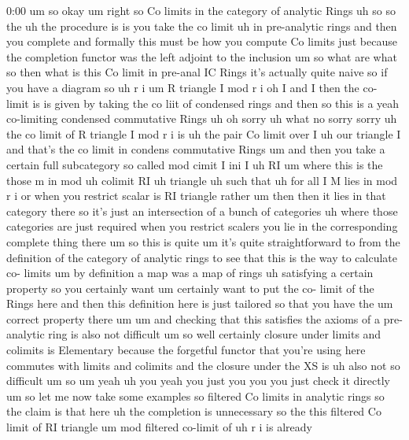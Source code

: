\begin{unfinished}{0:00}
um  so  okay  um  right  so  Co  limits  in  the
category  of  analytic
Rings  uh  so  so  the  uh  the  procedure  is
is  you  take  the  co
limit  uh  in  pre-analytic
rings  and  then  you
complete  and  formally  this  must  be  how
you  compute  Co  limits  just  because  the
completion  functor  was  the  left  adjoint
to  the
inclusion  um  so  what  are  what  so  then
what  is  this  Co  limit  in  pre-anal  IC
Rings  it's  actually  quite  naive  so  if
you  have  a  diagram
so  uh  r  i  um  R  triangle  I
mod  r  i  oh  I  and  I  then  the  co-  limit
is  is  given  by  taking  the  co  liit  of
condensed
rings
and  then  so  this  is  a
yeah  co-limiting  condensed  commutative
Rings  uh  oh  sorry  uh  what  no  sorry  sorry
uh  the  co  limit  of  R  triangle  I  mod  r
i  is  uh  the  pair  Co  limit  over  I  uh  our
triangle  I  and  that's  the  co  limit  in
condens  commutative  Rings  um  and  then
you  take  a  certain  full  subcategory  so
called  mod  cimit  I  ini  I
uh  RI  um  where  this  is  the  those  m  in
mod  uh  colimit
RI  uh  triangle  uh  such  that  uh  for  all  I
M  lies  in  mod  r  i  or  when  you  restrict
scalar  is  RI  triangle  rather  um  then
then  it  lies  in  that  category
there  so  it's  just  an  intersection  of  a
bunch  of  categories  uh  where  those
categories  are  just  required  when  you
restrict  scalers  you  lie  in  the
corresponding  complete  thing
there
um  so  this  is  quite
um
it's  quite  straightforward  to  from  the
definition  of  the  category  of  analytic
rings  to  see  that  this  is  the  way  to
calculate  co-  limits  um  by  definition  a
map  was  a  map  of  rings  uh  satisfying  a
certain  property  so  you  certainly  want
um  certainly  want  to  put  the  co-  limit
of  the  Rings  here  and  then  this
definition  here  is  just  tailored  so  that
you  have  the  um  correct  property
there  um
um  and  checking  that  this  satisfies  the
axioms  of  a  pre-analytic  ring  is  also
not  difficult
um  so  well  certainly  closure  under
limits  and  colimits  is  Elementary
because  the  forgetful  functor  that
you're  using  here  commutes  with  limits
and  colimits  and  the  closure  under  the
XS
is  uh  also  not  so  difficult
um  so
um  yeah
uh  you  yeah  you  just  you  you  you  just
check  it
directly  um  so  let  me  now  take  some
examples  so  filtered  Co  limits  in
analytic
rings  so  the  claim  is  that
here  uh  the  completion  is
unnecessary  so  the  this  filtered  Co
limit  of  RI  triangle  um  mod  filtered
co-limit  of  uh  r  i  is  already

\end{unfinished}
